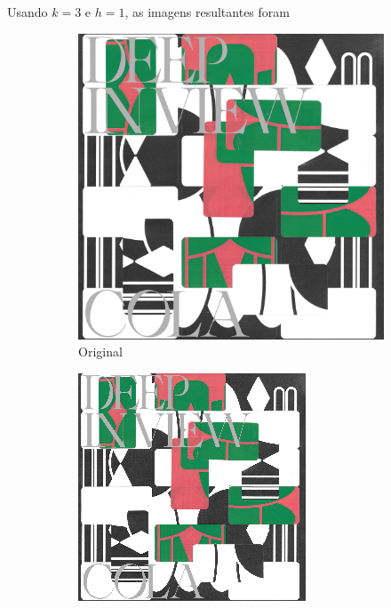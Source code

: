 \documentclass{article}
\begin{document}
Usando $k=3$ e $h=1$, as imagens resultantes foram
\clearpage
\begin{figure}[ht]
  \centering
  \begin{subfigure}{0.48\textwidth}
    \centering
    \includegraphics[width=\textwidth]{imagens-reais/deep-in-view/deepinview.png}
    \caption{Original}
  \end{subfigure}%
  \hfill
  \begin{subfigure}{0.48\textwidth}
    \centering
    \includegraphics[width=\textwidth]{imagens-reais/deep-in-view/compressed.png}

\end{subfigure}
\end{figure}
\end{document}
